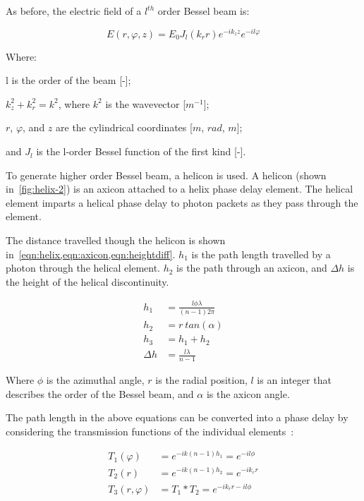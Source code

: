 As before, the electric field of a $l^{th}$ order Bessel beam is:

\begin{equation}
E(r,\varphi,z)=E_0J_l(k_r r)e^{-i k_z z}e^{-i l \varphi}
\label{eqn:hobb}
\end{equation}

\noindent Where:

\indent l is the order of the beam [-];

\indent $k_{z}^{2} + k_{r}^{2} =k^2$, where $k^2$ is the wavevector [$m^{-1}$];

\indent $r$, $\varphi$, and $z$ are the cylindrical coordinates [$m$, $rad$, $m$];

\indent and $J_l$ is the l-order Bessel function of the first kind [-].

\medskip


To generate higher order Bessel beam, a helicon is used.
A helicon (shown in~\cref{fig:helix-2}) is an axicon attached to a helix phase delay element.
The helical element imparts a helical phase delay to photon packets as they pass through the element.


The distance travelled though the helicon is shown in~\cref{eqn:helix,eqn:axicon,eqn:heightdiff}\cite{wei2015generation}.
$h_1$ is the path length travelled by a photon through the helical element.
$h_2$ is the path through an axicon, and $\Delta h$ is the height of the helical discontinuity.

\begin{align}
h_1&=\frac{l\phi\lambda}{(n-1)2\pi} \label{eqn:helix}\\
h_2&=r\ tan(\alpha)\label{eqn:axicon}\\
h_3&=h_1+h_2 \label{eqn:helicon}\\
\Delta h &= \frac{l\lambda}{n-1}\label{eqn:heightdiff}
\end{align}

Where $\phi$ is the azimuthal angle, $r$ is the radial position, $l$ is an integer that describes the order of the Bessel beam, and $\alpha$ is the axicon angle.

The path length in the above equations can be converted into a phase delay by considering the transmission functions of the individual elements~\cite{khonina1992trochoson,kotlyar2006diffraction,topuzoski2009conversion,qiong2012generalization}:


\begin{align}
T_1(\varphi)&=e^{-ik(n-1)h_1}=e^{-il\phi}\\
T_2(r)&=e^{-ik(n-1)h_2}=e^{-ik_rr}\\
T_3(r,\varphi)&=T_1*T_2=e^{-ik_rr-il\phi}\\
\end{align}

